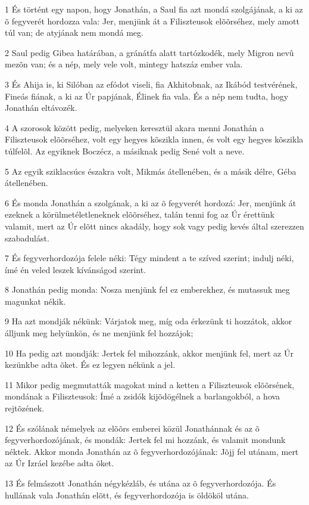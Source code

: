 \par 1 És történt egy napon, hogy Jonathán, a Saul fia azt mondá szolgájának, a ki az õ fegyverét hordozza vala: Jer, menjünk át a Filiszteusok elõõrséhez, mely amott túl van; de atyjának nem mondá meg.
\par 2 Saul pedig Gibea határában, a gránátfa alatt tartózkodék, mely Migron nevû mezõn van; és a nép, mely vele volt, mintegy hatszáz ember vala.
\par 3 És Ahija is, ki Silóban az efódot viseli, fia Akhitobnak, az Ikábód testvérének, Fineás fiának, a ki az Úr papjának, Élinek fia vala. És a nép nem tudta, hogy Jonathán eltávozék.
\par 4 A szorosok között pedig, melyeken keresztül akara menni Jonathán a Filiszteusok elõõrséhez, volt egy hegyes kõszikla innen, és volt egy hegyes kõszikla túlfelõl. Az egyiknek Boczécz, a másiknak pedig Sené volt a neve.
\par 5 Az egyik sziklacsúcs északra volt, Mikmás átellenében, és a másik délre, Géba átellenében.
\par 6 És monda Jonathán a szolgának, a ki az õ fegyverét hordozá: Jer, menjünk át ezeknek a körülmetéletleneknek elõõrséhez, talán tenni fog az Úr érettünk valamit, mert az Úr elõtt nincs akadály, hogy sok vagy pedig kevés által szerezzen szabadulást.
\par 7 És fegyverhordozója felele néki: Tégy mindent a te szíved szerint; indulj néki, ímé én veled leszek kívánságod szerint.
\par 8 Jonathán pedig monda: Nosza menjünk fel ez emberekhez, és mutassuk meg magunkat nékik.
\par 9 Ha azt mondják nékünk: Várjatok meg, míg oda érkezünk ti hozzátok, akkor álljunk meg helyünkön, és ne menjünk fel hozzájok;
\par 10 Ha pedig azt mondják: Jertek fel mihozzánk, akkor menjünk fel, mert az Úr kezünkbe adta õket. És ez legyen nékünk a jel.
\par 11 Mikor pedig megmutatták magokat mind a ketten a Filiszteusok elõõrsének, mondának a Filiszteusok: Ímé a zsidók kijõdögélnek a barlangokból, a hova rejtõzének.
\par 12 És szólának némelyek az elõõrs emberei közül Jonathánnak és az õ fegyverhordozójának, és mondák: Jertek fel mi hozzánk, és valamit mondunk néktek. Akkor monda Jonathán az õ fegyverhordozójának: Jõjj fel utánam, mert az Úr Izráel kezébe adta õket.
\par 13 És felmászott Jonathán négykézláb, és utána az õ fegyverhordozója. És hullának vala Jonathán elõtt, és fegyverhordozója is öldököl utána.
